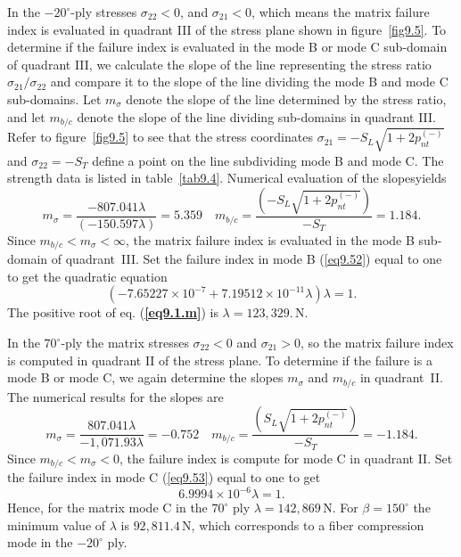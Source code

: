 \documentclass{AeroStructure-ERJohnson}
\begin{document}
\begin{example}
In the $-20^{\circ}$-ply stresses $\sigma_{22}<0$, and $\sigma_{21}<0$, which means the matrix failure index is evaluated in quadrant III of the stress plane shown in figure~\ref{fig9.5}. To determine if the failure index is evaluated in the mode B or mode C sub-domain of quadrant III, we calculate the slope of the line representing the stress ratio $\sigma_{21}/ \sigma_{22}$ and compare it to the slope of the line dividing the mode B and mode C sub-domains. Let $m_{\sigma}$ denote the slope of the line determined by the stress ratio, and let $m_{b/c}$ denote the slope of the line dividing sub-domains in quadrant III. Refer to figure~\ref{fig9.5} to see that the stress coordinates $\sigma_{21}=-S_{L} \sqrt{1+2 p_{n t}^{(-)}}$ and $\sigma_{22}=-S_{T}$ define a point on the line subdividing mode B and mode C. The strength data is listed in table~\ref{tab9.4}. Numerical evaluation of the slopes\break yields
\begin{equation}
m_{\sigma}=\frac{-807.041 \lambda}{(-150.597 \lambda)}=5.359 \quad m_{b/c}=\frac{\left(-S_{L}\sqrt{1+2 p_{n t}^{(-)}}\right)}{-S_{T}}=1.184. \label{eq9.1.l}\tag{l}
\end{equation}
Since $m_{b/c}<m_{\sigma}<\infty$, the matrix failure index is evaluated in the mode B sub-domain of quadrant~III. Set the failure index in mode B (\ref{eq9.52}) equal to one to get the quadratic equation
\begin{equation}
\left(-7.65227 \times 10^{-7}+7.19512 \times 10^{-11} \lambda\right) \lambda=1. \label{eq9.1.m}\tag{m}
\end{equation}
The positive root of eq. (\textbf{\ref{eq9.1.m}}) is $\lambda=123{,}329.\,\mathrm{N}$.

In the $70^{\circ}$-ply the matrix stresses $\sigma_{22}<0$ and $\sigma_{21}>0$, so the matrix failure index is computed in quadrant II of the stress plane. To determine if the failure is a mode B or mode C, we again determine the slopes $m_{\sigma}$ and $m_{b/c}$ in quadrant~II. The numerical results for the slopes are
\begin{equation}
m_{\sigma}=\frac{807.041 \lambda}{-1{,}071.93 \lambda}=-0.752 \quad m_{b/c}=\frac{\left(S_{L}\sqrt{1+2 p_{n t}^{(-)}}\right)}{-S_{T}}=-1.184. \label{eq9.1.n}\tag{n}
\end{equation}
Since $m_{b/c}<m_{\sigma}<0$, the failure index is compute for mode C in quadrant II. Set the failure index in mode C (\ref{eq9.53}) equal to one to get
\begin{equation}
6.9994 \times 10^{-6} \lambda=1. \label{eq9.1.o}\tag{o}
\end{equation}
Hence, for the matrix mode C in the $70^{\circ}$ ply $\lambda=142{,}869\,\mathrm{N}$. For $\beta=150^{\circ}$ the minimum value of $\lambda$ is $92{,}811.4\,\mathrm{N}$, which corresponds to a fiber compression mode in the $-20^{\circ}$ ply.


\end{example}
\end{document}
